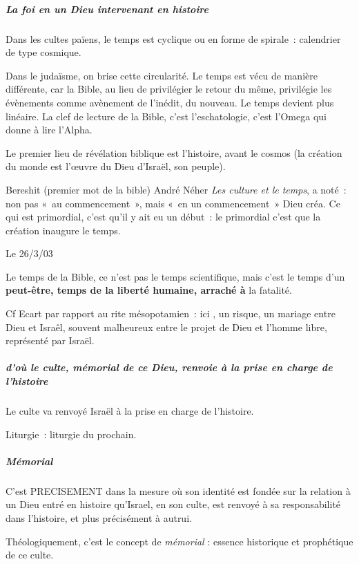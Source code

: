 \hypertarget{a-la-foi-en-un-dieu-intervenant-en-histoire}{%
\subparagraph{La foi en un Dieu intervenant en
histoire}\label{a-la-foi-en-un-dieu-intervenant-en-histoire}}

Dans les cultes païens, le temps est cyclique ou en forme de spirale~:
calendrier de type cosmique.

Dans le judaïsme, on brise cette circularité. Le temps est vécu de
manière différente, car la Bible, au lieu de privilégier le retour du
même, privilégie les évènements comme avènement de l'inédit, du nouveau.
Le temps devient plus linéaire. La clef de lecture de la Bible, c'est
l'eschatologie, c'est l'Omega qui donne à lire l'Alpha.

Le premier lieu de révélation biblique est l'histoire, avant le cosmos
(la création du monde est l'œuvre du Dieu d'Israël, son peuple).

Bereshit (premier mot de la bible) André Néher \emph{Les culture et le
temps}, a noté~: non pas «~au commencement~», mais «~en un
commencement~» Dieu créa. Ce qui est primordial, c'est qu'il y ait eu un
début~: le primordial c'est que la création inaugure le temps.

Le 26/3/03

Le temps de la Bible, ce n'est pas le temps scientifique, mais c'est le
temps d'un \textbf{peut-être, temps de la liberté humaine, arraché à} la
fatalité.

Cf Ecart par rapport au rite mésopotamien~: ici , un risque, un mariage
entre Dieu et Israêl, souvent malheureux entre le projet de Dieu et
l'homme libre, représenté par Israël.

\hypertarget{b.-douxf9-le-culte-muxe9morial-de-ce-dieu-renvoie-uxe0-la-prise-en-charge-de-lhistoire}{%
\subparagraph{d'où le culte, mémorial de ce Dieu, renvoie à la prise en
charge de
l'histoire}\label{b.-douxf9-le-culte-muxe9morial-de-ce-dieu-renvoie-uxe0-la-prise-en-charge-de-lhistoire}}

Le culte va renvoyé Israël à la prise en charge de l'histoire.

Liturgie~: liturgie du prochain.

\hypertarget{muxe9morial}{%
\subparagraph{Mémorial}\label{muxe9morial}}

C'est PRECISEMENT dans la mesure où son identité est fondée sur la
relation à un Dieu entré en histoire qu'Israel, en son culte, est
renvoyé à sa responsabilité dans l'histoire, et plus précisément à
autrui.

Théologiquement, c'est le concept de \emph{mémorial} : essence
historique et prophétique de ce culte.

